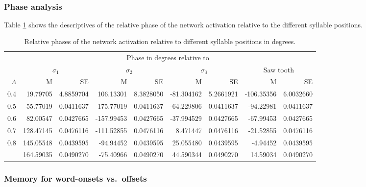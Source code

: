 \documentclass[
]{article}
\begin{document}
\hypertarget{phase-analysis-1}{%
\subsubsection{Phase analysis}\label{phase-analysis-1}}

Table \ref{tab:basic-experiment-global-phase-table2} shows the
descriptives of the relative phase of the network activation relative to
the different syllable positions.

\begin{table}

\caption{\label{tab:basic-experiment-global-phase-table2}Relative phases of the network activation relative to different syllable positions in degrees.}
\centering
\begin{tabular}[t]{rrrrrrrrr}
\toprule
\multicolumn{1}{c}{ } & \multicolumn{8}{c}{Phase in degrees relative to} \\
\cmidrule(l{3pt}r{3pt}){2-9}
\multicolumn{1}{c}{ } & \multicolumn{2}{c}{$\sigma_1$} & \multicolumn{2}{c}{$\sigma_2$} & \multicolumn{2}{c}{$\sigma_3$} & \multicolumn{2}{c}{Saw tooth} \\
\cmidrule(l{3pt}r{3pt}){2-3} \cmidrule(l{3pt}r{3pt}){4-5} \cmidrule(l{3pt}r{3pt}){6-7} \cmidrule(l{3pt}r{3pt}){8-9}
$\Lambda$ & M & SE & M & SE & M & SE & M & SE\\
\midrule
0.4 & 19.79705 & 4.8859704 & 106.13301 & 8.3828050 & -81.304162 & 5.2661921 & -106.35356 & 6.0032660\\
0.5 & 55.77019 & 0.0411637 & 175.77019 & 0.0411637 & -64.229806 & 0.0411637 & -94.22981 & 0.0411637\\
0.6 & 82.00547 & 0.0427665 & -157.99453 & 0.0427665 & -37.994529 & 0.0427665 & -67.99453 & 0.0427665\\
0.7 & 128.47145 & 0.0476116 & -111.52855 & 0.0476116 & 8.471447 & 0.0476116 & -21.52855 & 0.0476116\\
0.8 & 145.05548 & 0.0439595 & -94.94452 & 0.0439595 & 25.055480 & 0.0439595 & -4.94452 & 0.0439595\\
\addlinespace
0.9 & 164.59035 & 0.0490270 & -75.40966 & 0.0490270 & 44.590344 & 0.0490270 & 14.59034 & 0.0490270\\
\bottomrule
\end{tabular}
\end{table}

\clearpage

\hypertarget{memory-for-word-onsets-vs.-offsets}{%
\subsubsection{Memory for word-onsets
vs.~offsets}\label{memory-for-word-onsets-vs.-offsets}}
\end{document}
